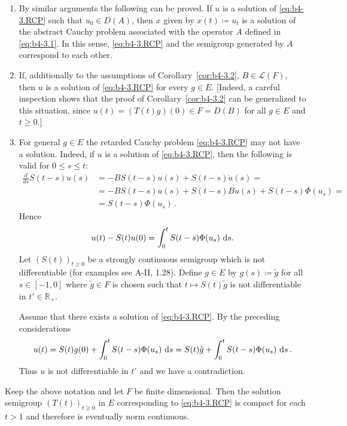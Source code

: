 \begin{remarks*} 
\begin{enumerate}[\upshape (a), wide, labelsep=1em]

\item 
By similar arguments the following can be proved. If $u$ is a solution of \eqref{eq:b4-3.RCP} such that $u_{0} \in D(A)$, then $x$ given by $x(t) \coloneq  u_t$ is a solution of the abstract Cauchy problem associated with the operator $A$ defined in \eqref{eq:b4-3.1}. 
In this sense, \eqref{eq:b4-3.RCP} and the semigroup generated by $A$ correspond to each other.

\item 
If, additionally to the assumptions of Corollary~\ref{cor:b4-3.2}, $B \in \mathcal{L}(F)$, then $u$ is a solution of \eqref{eq:b4-3.RCP} for every $g \in E$. 
[Indeed, a careful inspection shows that the proof of Corollary~\ref{cor:b4-3.2} can be generalized to this situation, since $u(t) = (T(t)g)(0) \in F = D(B)$ for all $g \in E$ and $t \geq 0$.]

\item 
For general $g \in E$ the retarded Cauchy problem \eqref{eq:b4-3.RCP} may not have a solution. 
Indeed, if $u$ is a solution of \eqref{eq:b4-3.RCP}, then the following is valid for $0 \leq s \leq t$:
\begin{equation*}
	\begin{aligned}
\frac{d}{ds}S(t-s)u(s) &= -BS(t-s)u(s) + S(t-s)\dot{u}(s) =\\
& = -BS(t-s)u(s) + S(t-s)Bu(s) + S(t-s)\Phi(u_s) = \\ & =S(t-s)\Phi(u_s)\,.
\end{aligned}
\end{equation*} 
Hence
\[
u(t) - S(t)u(0) = \int_0^t S(t-s)\Phi(u_s) \,\mathop{}\!\mathrm{d}{s}.
\]
Let $(S(t))_{t \geq 0}$ be a strongly continuous semigroup which is not differentiable (for examples see A-II,  1.28). 
Define $g \in E$ by $g(s)  \coloneq  \tilde{g}$ for all $s \in [-1,0]$ where $\tilde{g} \in F$ is chosen such that
$t \mapsto S(t)\tilde{g}$ is not differentiable in $t' \in \mathbb{R}_+$.

Assume that there exists a solution of \eqref{eq:b4-3.RCP}. 
By the preceding considerations
\[
u(t) = S(t)g(0) + \int_0^t S(t-s)\Phi(u_s) \,\mathop{}\!\mathrm{d}{s} = S(t)\tilde{g} + \int_0^t S(t-s)\Phi(u_s) \,\mathop{}\!\mathrm{d}{s}\,.
\]
Thus $u$ is not differentiable in $t'$ and we have a contradiction.
\end{enumerate}
\end{remarks*}
\begin{corollary}\label{cor:b4-3.3}
	Keep the above notation and let $F$ be finite dimensional. 
    Then the solution semigroup $(T(t))_{t \geq 0}$ in $E$ corresponding to \eqref{eq:b4-3.RCP} is compact for each $t > 1$ and therefore is eventually norm continuous.
\end{corollary}

